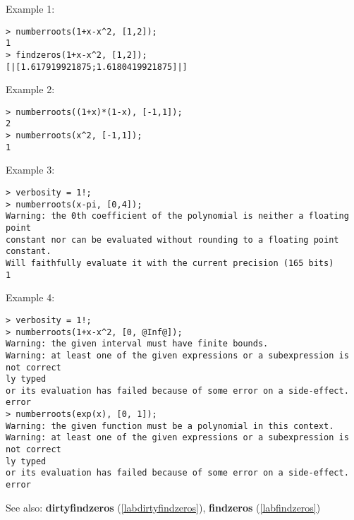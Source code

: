 \noindent Example 1: 
\begin{center}\begin{minipage}{15cm}\begin{Verbatim}[frame=single]
> numberroots(1+x-x^2, [1,2]);
1
> findzeros(1+x-x^2, [1,2]);
[|[1.617919921875;1.6180419921875]|]
\end{Verbatim}
\end{minipage}\end{center}
\noindent Example 2: 
\begin{center}\begin{minipage}{15cm}\begin{Verbatim}[frame=single]
> numberroots((1+x)*(1-x), [-1,1]);
2
> numberroots(x^2, [-1,1]);
1
\end{Verbatim}
\end{minipage}\end{center}
\noindent Example 3: 
\begin{center}\begin{minipage}{15cm}\begin{Verbatim}[frame=single]
> verbosity = 1!;
> numberroots(x-pi, [0,4]);
Warning: the 0th coefficient of the polynomial is neither a floating point
constant nor can be evaluated without rounding to a floating point constant.
Will faithfully evaluate it with the current precision (165 bits) 
1
\end{Verbatim}
\end{minipage}\end{center}
\noindent Example 4: 
\begin{center}\begin{minipage}{15cm}\begin{Verbatim}[frame=single]
> verbosity = 1!;
> numberroots(1+x-x^2, [0, @Inf@]);
Warning: the given interval must have finite bounds.
Warning: at least one of the given expressions or a subexpression is not correct
ly typed
or its evaluation has failed because of some error on a side-effect.
error
> numberroots(exp(x), [0, 1]);
Warning: the given function must be a polynomial in this context.
Warning: at least one of the given expressions or a subexpression is not correct
ly typed
or its evaluation has failed because of some error on a side-effect.
error
\end{Verbatim}
\end{minipage}\end{center}
See also: \textbf{dirtyfindzeros} (\ref{labdirtyfindzeros}), \textbf{findzeros} (\ref{labfindzeros})
